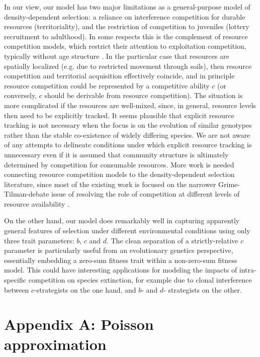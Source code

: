\documentclass[11pt]{article}
\begin{document}
In our view, our model has two major limitations as a general-purpose model of density-dependent selection: a reliance on interference competition for durable resources (territoriality), and the restriction of competition to juveniles (lottery recruitment to adulthood). In some respects this is the complement of resource competition models, which restrict their attention to exploitation competition, typically without age structure \citep{tilman_1982}. In the particular case that resources are spatially localized (e.g. due to restricted movement through soils), then resource competition and territorial acquisition effectively coincide, and in principle resource competition could be represented by a competitive ability $c$ (or conversely, $c$ should be derivable from resource competition). The situation is more complicated if the resources are well-mixed, since, in general, resource levels then need to be explicitly tracked. It seems plausible that explicit resource tracking is not necessary when the focus is on the evolution of similar genotypes rather than the stable co-existence of widely differing species. We are not aware of any attempts to delineate conditions under which explicit resource tracking is unnecessary even if it is assumed that community structure is ultimately determined by competition for consumable resources. More work is needed connecting resource competition models to the density-dependent selection literature, since most of the existing work is focused on the narrower Grime-Tilman-debate issue of resolving the role of competition at different levels of resource availability \citep{aerts_1999,davis_1998,tilman_2007}. 

On the other hand, our model does remarkably well in capturing apparently general features of selection under different environmental conditions using only three trait parameters: $b$, $c$ and $d$. The clean separation of a strictly-relative $c$ parameter is particularly useful from an evolutionary genetics perspective, essentially embedding a zero-sum fitness trait within a non-zero-sum fitness model. This could have interesting applications for modeling the impacts of intra-specific competition on species extinction, for example due to clonal interference \citep{gerrish_1998,desai_2007} between $c$-strategists on the one hand, and $b$- and $d$- strategists on the other. 



 

\section*{Appendix A: Poisson approximation}
\end{document}
